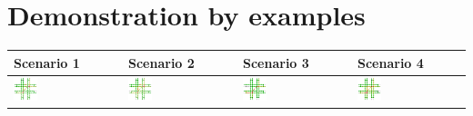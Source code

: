 \section{Demonstration by examples}
\label{section:evaluation}

\begin{table}[b]
	\centering
	\renewcommand{\arraystretch}{1.3}
	\begin{tabularx}{\textwidth}{|Y|Y|Y|Y|}
		\hline
		
		\textbf{Scenario} 1 & \textbf{Scenario 2} & \textbf{Scenario 3} & \textbf{Scenario 4} \\
		
		\hline
		
		\includegraphics[width=0.23\textwidth]{../gfx/data/E1_003.png} &
		\includegraphics[width=0.23\textwidth]{../gfx/data/E2_003.png} &
		\includegraphics[width=0.23\textwidth]{../gfx/data/E3_003.png} &
		\includegraphics[width=0.23\textwidth]{../gfx/data/E4_003.png} \\
		
		\hline
		

\end{tabularx}
\end{table}
